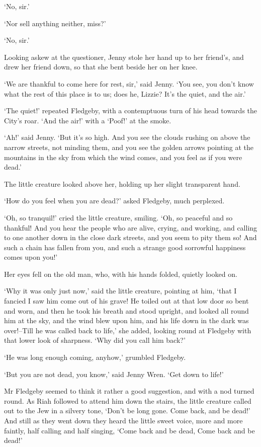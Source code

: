 ‘No, sir.’

‘Nor sell anything neither, miss?’

‘No, sir.’

Looking askew at the questioner, Jenny stole her hand up to her
friend’s, and drew her friend down, so that she bent beside her on her
knee.

‘We are thankful to come here for rest, sir,’ said Jenny. ‘You see, you
don’t know what the rest of this place is to us; does he, Lizzie? It’s
the quiet, and the air.’

‘The quiet!’ repeated Fledgeby, with a contemptuous turn of his head
towards the City’s roar. ‘And the air!’ with a ‘Poof!’ at the smoke.

‘Ah!’ said Jenny. ‘But it’s so high. And you see the clouds rushing
on above the narrow streets, not minding them, and you see the golden
arrows pointing at the mountains in the sky from which the wind comes,
and you feel as if you were dead.’

The little creature looked above her, holding up her slight transparent
hand.

‘How do you feel when you are dead?’ asked Fledgeby, much perplexed.

‘Oh, so tranquil!’ cried the little creature, smiling. ‘Oh, so peaceful
and so thankful! And you hear the people who are alive, crying, and
working, and calling to one another down in the close dark streets, and
you seem to pity them so! And such a chain has fallen from you, and such
a strange good sorrowful happiness comes upon you!’

Her eyes fell on the old man, who, with his hands folded, quietly looked
on.

‘Why it was only just now,’ said the little creature, pointing at him,
‘that I fancied I saw him come out of his grave! He toiled out at
that low door so bent and worn, and then he took his breath and stood
upright, and looked all round him at the sky, and the wind blew upon
him, and his life down in the dark was over!--Till he was called back
to life,’ she added, looking round at Fledgeby with that lower look of
sharpness. ‘Why did you call him back?’

‘He was long enough coming, anyhow,’ grumbled Fledgeby.

‘But you are not dead, you know,’ said Jenny Wren. ‘Get down to life!’

Mr Fledgeby seemed to think it rather a good suggestion, and with a nod
turned round. As Riah followed to attend him down the stairs, the little
creature called out to the Jew in a silvery tone, ‘Don’t be long gone.
Come back, and be dead!’ And still as they went down they heard the
little sweet voice, more and more faintly, half calling and half
singing, ‘Come back and be dead, Come back and be dead!’


